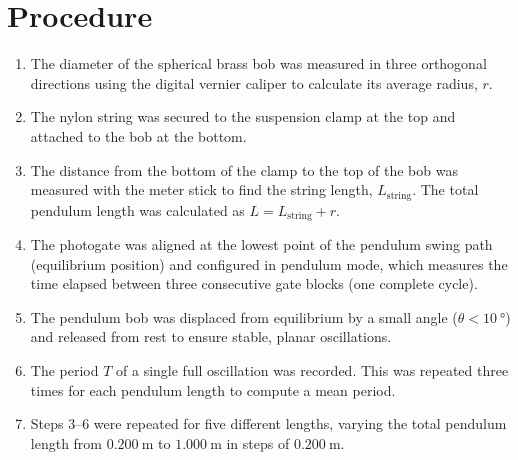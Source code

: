 \section{Procedure}
\begin{enumerate}
  \item The diameter of the spherical brass bob was measured in three orthogonal directions using the digital vernier caliper to calculate its average radius, $r$.
  \item The nylon string was secured to the suspension clamp at the top and attached to the bob at the bottom.
  \item The distance from the bottom of the clamp to the top of the bob was measured with the meter stick to find the string length, $L_{\text{string}}$. The total pendulum length was calculated as $L = L_{\text{string}} + r$.
  \item The photogate was aligned at the lowest point of the pendulum swing path (equilibrium position) and configured in pendulum mode, which measures the time elapsed between three consecutive gate blocks (one complete cycle).
  \item The pendulum bob was displaced from equilibrium by a small angle ($\theta < \SI{10}{\degree}$) and released from rest to ensure stable, planar oscillations.
  \item The period $T$ of a single full oscillation was recorded. This was repeated three times for each pendulum length to compute a mean period.
  \item Steps 3–6 were repeated for five different lengths, varying the total pendulum length from $\SI{0.200}{\meter}$ to $\SI{1.000}{\meter}$ in steps of $\SI{0.200}{\meter}$.
\end{enumerate}

